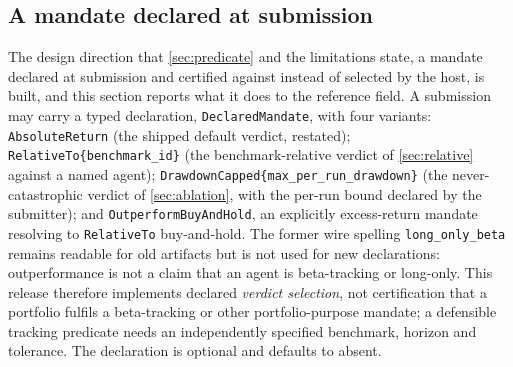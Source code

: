 
\subsection{A mandate declared at submission}\label{sec:mandate}

The design direction that \cref{sec:predicate} and the limitations state, a mandate declared at submission and certified against instead of selected by the host, is built, and this section reports what it does to the reference field. A submission may carry a typed declaration, \texttt{DeclaredMandate}, with four variants: \texttt{AbsoluteReturn} (the shipped default verdict, restated); \texttt{RelativeTo\{benchmark\_id\}} (the benchmark-relative verdict of \cref{sec:relative} against a named agent); \texttt{DrawdownCapped\{max\_per\_run\_drawdown\}} (the never-catastrophic verdict of \cref{sec:ablation}, with the per-run bound declared by the submitter); and \texttt{OutperformBuyAndHold}, an explicitly excess-return mandate resolving to \texttt{RelativeTo} buy-and-hold. The former wire spelling \texttt{long\_only\_beta} remains readable for old artifacts but is not used for new declarations: outperformance is not a claim that an agent is beta-tracking or long-only. This release therefore implements declared \emph{verdict selection}, not certification that a portfolio fulfils a beta-tracking or other portfolio-purpose mandate; a defensible tracking predicate needs an independently specified benchmark, horizon and tolerance. The declaration is optional and defaults to absent.

